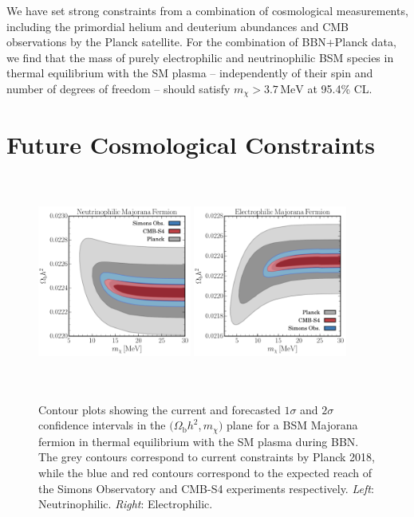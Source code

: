\noindent We have set strong constraints from a combination of cosmological measurements, including the primordial helium and deuterium abundances and CMB observations by the Planck satellite. For the combination of BBN+Planck data, we find that the mass of purely electrophilic and neutrinophilic BSM species in thermal equilibrium with the SM plasma -- independently of their spin and number of degrees of freedom -- should satisfy $m_\chi > 3.7\,\text{MeV}$ at 95.4\% CL. 

\section{Future Cosmological Constraints}\label{sec:future}

\begin{figure}[t]
    \centering
    \includegraphics[width=0.45\textwidth,height=200pt]{figures/Nu_Maj_cmb_exclusion.pdf} \qquad
    \includegraphics[width=0.45\textwidth,height=200pt]{figures/EE_Maj_cmb_exclusion.pdf}
    \caption{Contour plots showing the current and forecasted $1\sigma$ and $2\sigma$ confidence intervals in the $(\Omega_{\mathrm{b}} h^2$,\,$m_\chi)$ plane for a BSM Majorana fermion in thermal equilibrium with the SM plasma during BBN. The grey contours correspond to current constraints by Planck 2018, while the blue and red contours correspond to the expected reach of the Simons Observatory and CMB-S4 experiments respectively. \emph{Left}: Neutrinophilic. \emph{Right}: Electrophilic.}
    \label{fig:Future_1-2D}
\end{figure}


